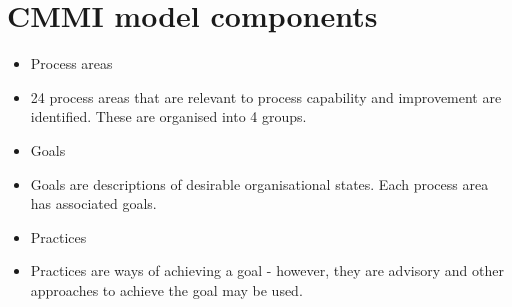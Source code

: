 \section{CMMI model components}
\begin{itemize}

\item Process areas

   \item 24 process areas that are relevant to process capability and improvement are identified. These are organised into 4 groups.

\item Goals

   \item Goals are descriptions of desirable organisational states. Each process area has associated goals.

\item Practices

   \item Practices are ways of achieving a goal - however, they are advisory and other approaches to achieve the goal may be used.


\end{itemize}
\newpage
